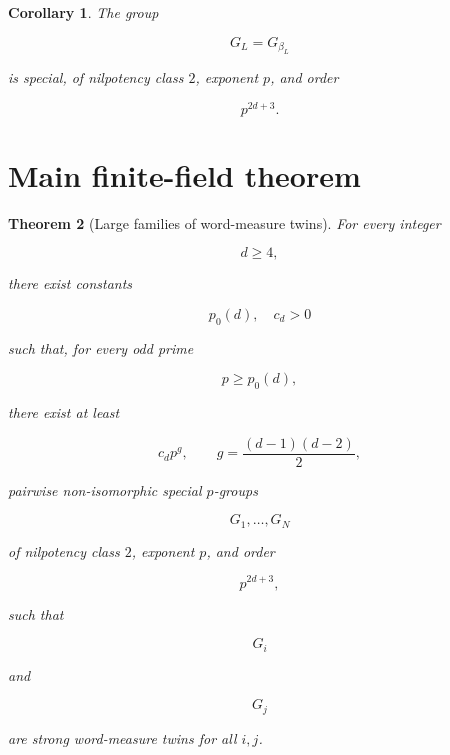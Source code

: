 \documentclass[11pt]{article}
\newtheorem{theorem}{Theorem}[section]
\newtheorem{corollary}[theorem]{Corollary}
\begin{document}
\begin{corollary}
The group

\[
G_L=G_{\beta_L}
\]

is special, of nilpotency class $2$, exponent $p$, and order

\[
p^{2d+3}.
\]

\end{corollary}

\section{Main finite-field theorem}

\begin{theorem}[Large families of word-measure twins]
For every integer

\[
d\ge4,
\]

there exist constants

\[
p_0(d),\quad c_d>0
\]

such that, for every odd prime

\[
p\ge p_0(d),
\]

there exist at least

\[
c_d p^g,
\qquad
g=\frac{(d-1)(d-2)}2,
\]

pairwise non-isomorphic special $p$-groups

\[
G_1,\ldots,G_N
\]

of nilpotency class $2$, exponent $p$, and order

\[
p^{2d+3},
\]

such that

\[
G_i
\]

and

\[
G_j
\]

are strong word-measure twins for all $i,j$.

\end{theorem}
\end{document}
